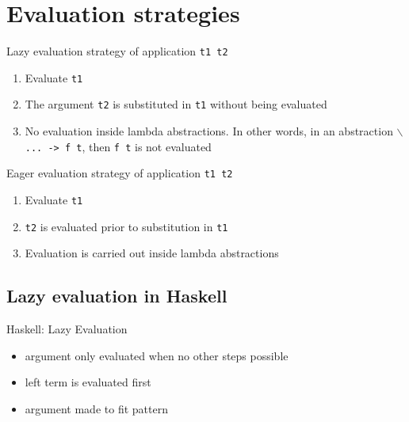 \documentclass{article}
\begin{document}
\section{Evaluation strategies}
Lazy evaluation strategy of application \texttt{t1 t2}
\begin{enumerate}
    \item Evaluate \texttt{t1}
    \item The argument \texttt{t2} is substituted in \texttt{t1} without being evaluated
    \item No evaluation inside lambda abstractions. In other words, in an abstraction 
    \texttt{$\backslash$... -> f t}, then \texttt{f t} is not evaluated
\end{enumerate}
Eager evaluation strategy of application \texttt{t1 t2}
\begin{enumerate}
    \item Evaluate \texttt{t1}
    \item \texttt{t2} is evaluated prior to substitution in \texttt{t1}
    \item Evaluation is carried out inside lambda abstractions
\end{enumerate}

\subsection{Lazy evaluation in Haskell}
Haskell: Lazy Evaluation
\begin{itemize}
    \item argument only evaluated when no other steps possible
    \item left term is evaluated first
    \item argument made to fit pattern
\end{itemize}
\end{document}
